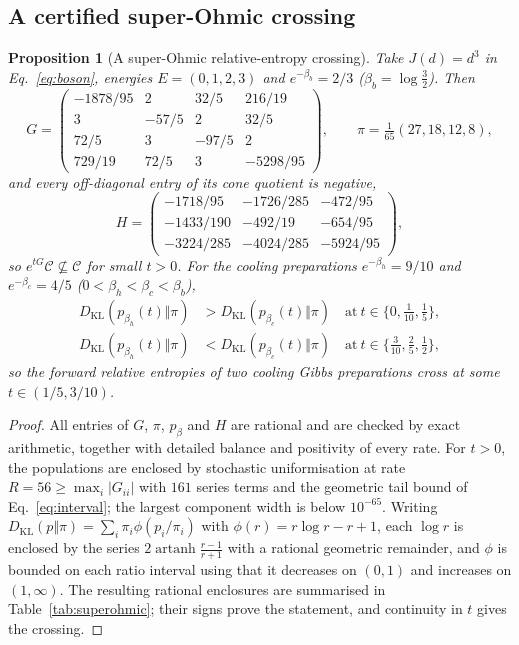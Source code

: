 \documentclass[11pt,a4paper]{article}
\newtheorem{proposition}[theorem]{Proposition}
\theoremstyle{remark}\newtheorem{remark}[theorem]{Remark}
\newcommand{\C}{\mathcal C}
\newcommand{\KL}{D_{\mathrm{KL}}}
\begin{document}
\subsection{A certified super-Ohmic crossing}\label{sec:superohmic}
\begin{proposition}[A super-Ohmic relative-entropy crossing]\label{prop:superohmic}
Take $J(d)=d^3$ in Eq.~\eqref{eq:boson}, energies $E=(0,1,2,3)$ and $e^{-\beta_b}=2/3$ ($\beta_b=\log\frac32$). Then
\begin{equation}
 G=\begin{pmatrix}
 -1878/95&2&32/5&216/19\\
 3&-57/5&2&32/5\\
 72/5&3&-97/5&2\\
 729/19&72/5&3&-5298/95
 \end{pmatrix},\qquad
 \pi=\tfrac1{65}(27,18,12,8),
 \label{eq:superG}
\end{equation}
and every off-diagonal entry of its cone quotient is negative,
\begin{equation}
 H=\begin{pmatrix}
 -1718/95&-1726/285&-472/95\\
 -1433/190&-492/19&-654/95\\
 -3224/285&-4024/285&-5924/95
 \end{pmatrix},
 \label{eq:superH}
\end{equation}
so $e^{tG}\C\not\subseteq\C$ for small $t>0$. For the cooling preparations $e^{-\beta_h}=9/10$ and $e^{-\beta_c}=4/5$ ($0<\beta_h<\beta_c<\beta_b$),
\begin{equation}
\begin{aligned}
 \KL(p_{\beta_h}(t)\Vert\pi)&>\KL(p_{\beta_c}(t)\Vert\pi)\quad\text{at}\ t\in\{0,\tfrac1{10},\tfrac15\},\\
 \KL(p_{\beta_h}(t)\Vert\pi)&<\KL(p_{\beta_c}(t)\Vert\pi)\quad\text{at}\ t\in\{\tfrac3{10},\tfrac25,\tfrac12\},
\end{aligned}
\end{equation}
so the forward relative entropies of two cooling Gibbs preparations cross at some $t\in(1/5,3/10)$.
\end{proposition}
\begin{proof}
All entries of $G$, $\pi$, $p_\beta$ and $H$ are rational and are checked by exact arithmetic, together with detailed balance and positivity of every rate. For $t>0$, the populations are enclosed by stochastic uniformisation at rate $R=56\ge\max_i|G_{ii}|$ with $161$ series terms and the geometric tail bound of Eq.~\eqref{eq:interval}; the largest component width is below $10^{-65}$. Writing $\KL(p\Vert\pi)=\sum_i\pi_i\phi(p_i/\pi_i)$ with $\phi(r)=r\log r-r+1$, each $\log r$ is enclosed by the series $2\operatorname{artanh}\frac{r-1}{r+1}$ with a rational geometric remainder, and $\phi$ is bounded on each ratio interval using that it decreases on $(0,1)$ and increases on $(1,\infty)$. The resulting rational enclosures are summarised in Table~\ref{tab:superohmic}; their signs prove the statement, and continuity in $t$ gives the crossing.
\end{proof}
\end{document}

